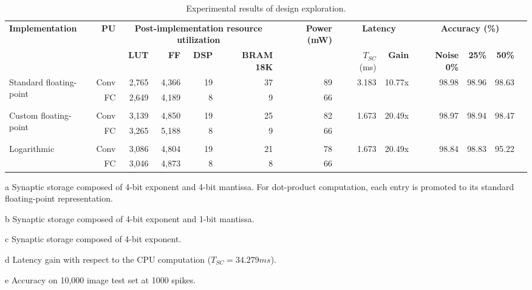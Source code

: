 \begin{table}[!t]
	\begin{threeparttable}
		\centering
		\caption{Experimental results of design exploration.}\label{tab:results}
		\scriptsize
		\begin{tabular}{lrrrrrrrrrrrrrrr}\toprule
			\multirow{2}{*}{\textbf{Implementation}} &\multirow{2}{*}{\textbf{PU}} &\multicolumn{4}{c}{\textbf{Post-implementation resource utilization}} & &\multirow{2}{*}{\textbf{Power (mW)}} & &\multicolumn{2}{c}{\textbf{Latency}} & &\multicolumn{3}{c}{\textbf{Accuracy (\%)\tnote{e}}} \\\cmidrule{3-6}\cmidrule{10-11}\cmidrule{13-15}
			& &\textbf{LUT} &\textbf{FF} &\textbf{DSP} &\textbf{BRAM 18K} & & & &$T_{SC}$ (ms) &\textbf{Gain\tnote{d}} & &\textbf{Noise 0\%} &\textbf{25\%} &\textbf{50\%} \\\midrule
			\multirow{2}{*}{Standard floating-point\tnote{a}} &Conv &2,765 &4,366 &19 &37 & &89 & &\multirow{2}{*}{3.183} &\multirow{2}{*}{10.77x} & &\multirow{2}{*}{98.98} &\multirow{2}{*}{98.96} &\multirow{2}{*}{98.63} \\
			&FC &2,649 &4,189 &8 &9 & &66 & & & & & & & \\
			& & & & & & & & & & & & & & \\
			\multirow{2}{*}{Custom floating-point\tnote{b}} &Conv &3,139 &4,850 &19 &25 & &82 & &\multirow{2}{*}{1.673} &\multirow{2}{*}{20.49x} & &\multirow{2}{*}{98.97} &\multirow{2}{*}{98.94} &\multirow{2}{*}{98.47} \\
			&FC &3,265 &5,188 &8 &9 & &66 & & & & & & & \\
			& & & & & & & & & & & & & & \\
			\multirow{2}{*}{Logarithmic\tnote{c}} &Conv &3,086 &4,804 &19 &21 & &78 & &\multirow{2}{*}{1.673} &\multirow{2}{*}{20.49x} & &\multirow{2}{*}{98.84} &\multirow{2}{*}{98.83} &\multirow{2}{*}{95.22} \\
			&FC &3,046 &4,873 &8 &8 & &66 & & & & & & & \\
			\bottomrule
		\end{tabular}
		\begin{tablenotes}
			\scriptsize
			\item[a] Synaptic storage composed of 4-bit exponent and 4-bit mantissa. For dot-product computation, each entry is promoted to its standard floating-point representation.
			\item[b] Synaptic storage composed of 4-bit exponent and 1-bit mantissa.
			\item[c] Synaptic storage composed of 4-bit exponent.
			\item[d] Latency gain with respect to the CPU computation ($T_{SC} = 34.279 ms$).
			\item[e] Accuracy on 10,000 image test set at 1000 spikes.
		\end{tablenotes}
	\end{threeparttable}
\end{table}